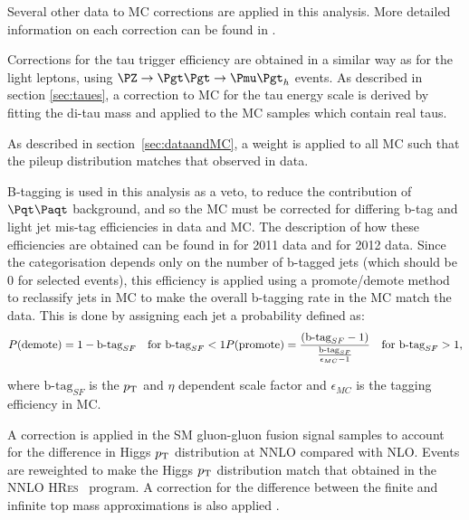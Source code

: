 Several other data to \ac{MC} corrections are applied in this analysis. 
More detailed information on each correction can be found in \cite{HIG-13-004}. 

Corrections for the tau trigger efficiency are 
obtained in a similar way as for the light leptons, using $\PZ\to\Pgt\Pgt\to\Pmu\Pgt_{h}$ events. As described in
section \ref{sec:taues}, a correction to \ac{MC} for the tau energy
scale is derived by fitting the di-tau mass and applied to the \ac{MC} samples
which contain real taus.

As described in section~\ref{sec:dataandMC}, a weight is applied to all \ac{MC} such
that the pileup distribution matches that observed in data.

B-tagging is used in this analysis as a veto, to reduce the contribution of
$\ttbar$ background, and so the \ac{MC} must be corrected for differing b-tag
and light jet mis-tag efficiencies in data and \ac{MC}. The description of how
these efficiencies are obtained can be found in \cite{CMS-PAS-BTV-11-004} for
2011 data and \cite{CMS-PAS-BTV-13-001} for 2012 data. Since the categorisation 
depends only on the number of b-tagged jets (which should be 0 for selected events), 
this efficiency is applied using a promote/demote method to reclassify jets in \ac{MC} 
to make the overall b-tagging rate in the \ac{MC} match the data. This is done
by assigning each jet a probability defined as:
\begin{equation}
P(\text{demote})  = 1 - \text{b-tag}_{SF} \quad \text{for } \text{b-tag}_{SF} < 1 \\
P(\text{promote}) = \frac{\left(\text{b-tag}_{SF} -
1\right)}{\frac{\text{b-tag}_{SF}}{\epsilon_{MC}-1} } \quad \text{for } \text{b-tag}_{SF} > 1 ,
\end{equation}

where $\text{b-tag}_{SF}$ is the $p_{\mathrm{T}}$ and $\eta$ dependent scale factor and
$\epsilon_{MC}$ is the tagging efficiency in \ac{MC}.

A correction is applied in the \ac{SM} gluon-gluon fusion signal
samples to account for the difference in Higgs $p_{\mathrm{T}}$ distribution at \ac{NNLO}
compared with \ac{NLO}. Events are reweighted to make the Higgs $p_{\mathrm{T}}$
distribution match that obtained in the \ac{NNLO} \textsc{HRes}~\cite{deFlorian:2012mx} program. 
A correction for the difference between the finite and infinite top
mass approximations is also applied \cite{Grazzini:2013mca}.


